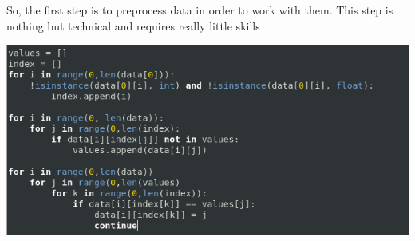\begin{minipage}{\linewidth}
\vspace{0.5cm}
So, the first step is to preprocess data in order to work with them. This step is nothing but technical and requires really little skills

\includegraphics[width=\textwidth]{img/PreprocessCode.png}

\end{minipage}

\vspace{0.5cm}

